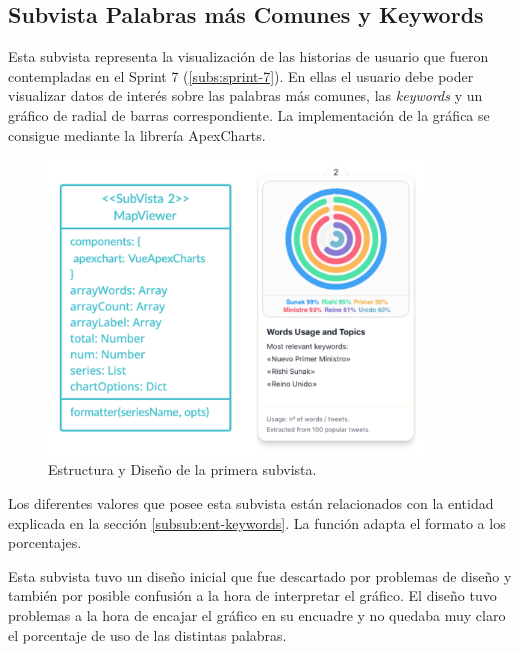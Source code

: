 \subsection{Subvista Palabras más Comunes y Keywords}\label{subs:vista-key}
Esta subvista representa la visualización de las historias de usuario que fueron contempladas en el Sprint 7 (\ref{subs:sprint-7}). En ellas el usuario debe poder visualizar datos de interés sobre las palabras más comunes, las \textit{keywords} y un gráfico de radial de barras correspondiente. La implementación de la gráfica se consigue mediante la librería ApexCharts.

\begin{figure}[H]
    \centering
    \myfloatalign
    \includegraphics[width=0.9\textwidth]{gfx/subvista2.png}
    \caption[Estructura y Diseño de la segunda subvista]{Estructura y Diseño de la primera subvista.}\label{gfx:subvista2}
\end{figure}

Los diferentes valores que posee esta subvista están relacionados con la entidad explicada en la sección \ref{subsub:ent-keywords}. La función adapta el formato a los porcentajes.

\vspace{0.3cm}

Esta subvista tuvo un diseño inicial que fue descartado por problemas de diseño y también por posible confusión a la hora de interpretar el gráfico. El diseño tuvo problemas a la hora de encajar el gráfico en su encuadre y no quedaba muy claro el porcentaje de uso de las distintas palabras.

